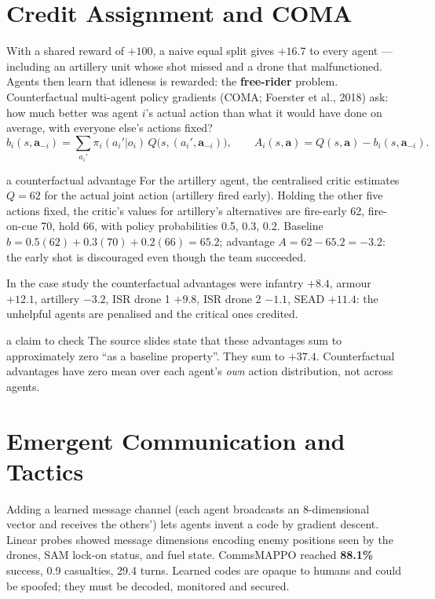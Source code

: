 \documentclass[11pt]{article}
\begin{document}
\section{Credit Assignment and COMA}
With a shared reward of $+100$, a naive equal split gives $+16.7$ to every agent --- including an artillery unit whose shot missed and a drone that malfunctioned. Agents then learn that idleness is rewarded: the \textbf{free-rider} problem. Counterfactual multi-agent policy gradients (COMA; Foerster et al., 2018) ask: how much better was agent $i$'s actual action than what it would have done on average, with everyone else's actions fixed?
\[b_i(s,\mathbf a_{-i})=\sum_{a_i'}\pi_i(a_i'|o_i)\,Q\big(s,(a_i',\mathbf a_{-i})\big),\qquad A_i(s,\mathbf a)=Q(s,\mathbf a)-b_i(s,\mathbf a_{-i}).\]
\begin{example}{a counterfactual advantage}
For the artillery agent, the centralised critic estimates $Q=62$ for the actual joint action (artillery fired early). Holding the other five actions fixed, the critic's values for artillery's alternatives are fire-early 62, fire-on-cue 70, hold 66, with policy probabilities 0.5, 0.3, 0.2. Baseline $b=0.5(62)+0.3(70)+0.2(66)=65.2$; advantage $A=62-65.2=-3.2$: the early shot is discouraged even though the team succeeded.
\end{example}
In the case study the counterfactual advantages were infantry $+8.4$, armour $+12.1$, artillery $-3.2$, ISR drone 1 $+9.8$, ISR drone 2 $-1.1$, SEAD $+11.4$: the unhelpful agents are penalised and the critical ones credited.
\begin{pitfall}{a claim to check}
The source slides state that these advantages sum to approximately zero ``as a baseline property''. They sum to $+37.4$. Counterfactual advantages have zero mean over each agent's \emph{own} action distribution, not across agents.
\end{pitfall}

\section{Emergent Communication and Tactics}
Adding a learned message channel (each agent broadcasts an 8-dimensional vector and receives the others') lets agents invent a code by gradient descent. Linear probes showed message dimensions encoding enemy positions seen by the drones, SAM lock-on status, and fuel state. CommsMAPPO reached \textbf{88.1\%} success, 0.9 casualties, 29.4 turns. Learned codes are opaque to humans and could be spoofed; they must be decoded, monitored and secured.
\end{document}

